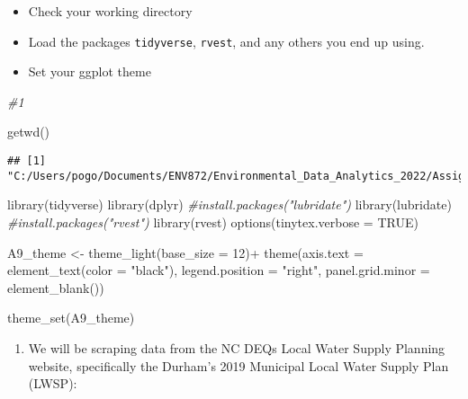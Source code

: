 \documentclass[
]{article}
\newenvironment{Shaded}{\begin{snugshade}}{\end{snugshade}}
\newcommand{\AttributeTok}[1]{\textcolor[rgb]{0.77,0.63,0.00}{#1}}
\newcommand{\CommentTok}[1]{\textcolor[rgb]{0.56,0.35,0.01}{\textit{#1}}}
\newcommand{\ConstantTok}[1]{\textcolor[rgb]{0.00,0.00,0.00}{#1}}
\newcommand{\DecValTok}[1]{\textcolor[rgb]{0.00,0.00,0.81}{#1}}
\newcommand{\FunctionTok}[1]{\textcolor[rgb]{0.00,0.00,0.00}{#1}}
\newcommand{\NormalTok}[1]{#1}
\newcommand{\OtherTok}[1]{\textcolor[rgb]{0.56,0.35,0.01}{#1}}
\newcommand{\SpecialCharTok}[1]{\textcolor[rgb]{0.00,0.00,0.00}{#1}}
\newcommand{\StringTok}[1]{\textcolor[rgb]{0.31,0.60,0.02}{#1}}
\providecommand{\tightlist}{%
  \setlength{\itemsep}{0pt}\setlength{\parskip}{0pt}}
\begin{document}
\begin{itemize}
\tightlist
\item
  Check your working directory
\item
  Load the packages \texttt{tidyverse}, \texttt{rvest}, and any others
  you end up using.
\item
  Set your ggplot theme
\end{itemize}

\begin{Shaded}
\begin{Highlighting}[]
\CommentTok{\#1}

\FunctionTok{getwd}\NormalTok{()}
\end{Highlighting}
\end{Shaded}

\begin{verbatim}
## [1] "C:/Users/pogo/Documents/ENV872/Environmental_Data_Analytics_2022/Assignments"
\end{verbatim}

\begin{Shaded}
\begin{Highlighting}[]
\FunctionTok{library}\NormalTok{(tidyverse)}
\FunctionTok{library}\NormalTok{(dplyr)}
\CommentTok{\#install.packages("lubridate")}
\FunctionTok{library}\NormalTok{(lubridate)}
\CommentTok{\#install.packages("rvest")}
\FunctionTok{library}\NormalTok{(rvest)}
\FunctionTok{options}\NormalTok{(}\AttributeTok{tinytex.verbose =} \ConstantTok{TRUE}\NormalTok{)}

\NormalTok{A9\_theme }\OtherTok{\textless{}{-}} \FunctionTok{theme\_light}\NormalTok{(}\AttributeTok{base\_size =} \DecValTok{12}\NormalTok{)}\SpecialCharTok{+}
   \FunctionTok{theme}\NormalTok{(}\AttributeTok{axis.text =} \FunctionTok{element\_text}\NormalTok{(}\AttributeTok{color =} \StringTok{"black"}\NormalTok{), }
        \AttributeTok{legend.position =} \StringTok{"right"}\NormalTok{, }\AttributeTok{panel.grid.minor =} \FunctionTok{element\_blank}\NormalTok{())}

\FunctionTok{theme\_set}\NormalTok{(A9\_theme)}
\end{Highlighting}
\end{Shaded}

\begin{enumerate}
\def\labelenumi{\arabic{enumi}.}
\setcounter{enumi}{1}
\tightlist
\item
  We will be scraping data from the NC DEQs Local Water Supply Planning
  website, specifically the Durham's 2019 Municipal Local Water Supply
  Plan (LWSP):
\end{enumerate}
\end{document}
